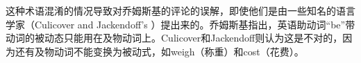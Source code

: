 这种术语混淆的情况导致对乔姆斯基的评论的误解，即使他们是由一些知名的语言学家（Culicover and Jackendoff's \citeyearpar[]{CJ2005a}）提出来的。乔姆斯基指出，英语助动词“be”带动词的被动态只能用在及物动词上。Culicover和Jackendoff则认为这是不对的，因为还有及物动词不能变换为被动式，如weigh（称重）和cost（花费）。 
\eal
{}
\zl

